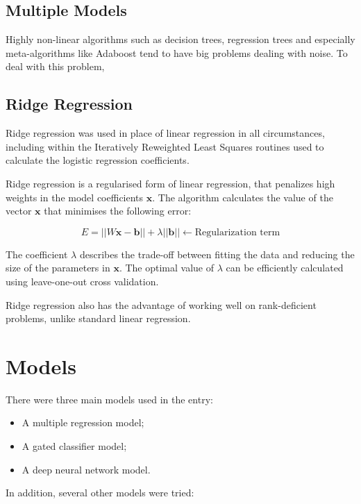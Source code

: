 \documentclass{article}
\begin{document}
\subsection{Multiple Models}

Highly non-linear algorithms such as decision trees, regression trees and especially meta-algorithms like Adaboost tend to have big problems dealing with noise.  To deal with this problem, 

\subsection{Ridge Regression}

Ridge regression was used in place of linear regression in all circumstances, including within the Iteratively Reweighted Least Squares routines used to calculate the logistic regression coefficients.

Ridge regression is a regularised form of linear regression, that penalizes high weights in the model coefficients $\mathbf{x}$.  The algorithm calculates the value of the vector $\mathbf{x}$ that minimises the following error:

\begin{equation}
  E = ||W\mathbf{x} - \mathbf{b}|| + \lambda ||\mathbf{b}|| \leftarrow \mbox{Regularization term}
\end{equation}

The coefficient $\lambda$ describes the trade-off between fitting the data and reducing the size of the parameters in $\mathbf{x}$.  The optimal value of $\lambda$ can be efficiently calculated using leave-one-out cross validation.

Ridge regression also has the advantage of working well on rank-deficient problems, unlike standard linear regression.

\section{Models}

There were three main models used in the entry:

\begin{itemize}
\item A multiple regression model;
\item A gated classifier model;
\item A deep neural network model.
\end{itemize}

In addition, several other models were tried:
\end{document}
